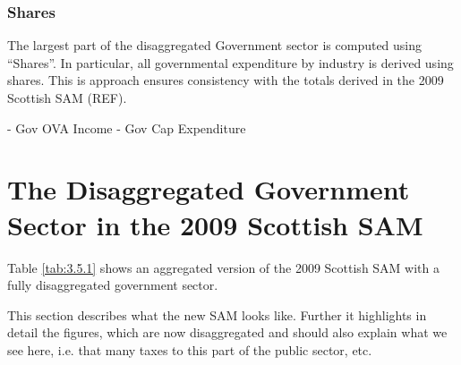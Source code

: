 \subsubsection{Shares}

The largest part of the disaggregated Government sector is computed using ``Shares''. In particular, all governmental expenditure by industry is derived using shares. This is approach ensures consistency with the totals derived in the 2009 Scottish SAM (REF).

- Gov OVA Income
- Gov Cap Expenditure

\bigskip



\section{The Disaggregated Government Sector in the 2009 Scottish SAM}
\label{sec:3.4}

Table \ref{tab:3.5.1} shows an aggregated version of the 2009 Scottish SAM with a fully disaggregated government sector.

This section describes what the new SAM looks like. Further it highlights in detail the figures, which are now disaggregated and should also explain what we see here, i.e. that many taxes to this part of the public sector, etc.

